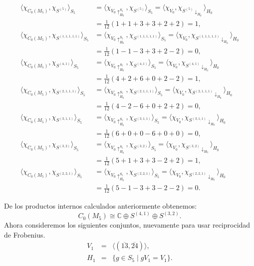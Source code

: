 \documentclass[12pt]{book}
\theoremstyle{definition}
\newcounter{in}
\begin{document}
  \begin{align*}
    \langle\chi_{C_{0}(M_{5})},\chi_{S^{(5)}}\rangle_{S_{5}}&=\langle\chi_{V_{0}\uparrow^{S_{5}}_{H_0}},\chi_{S^{(5)}}\rangle_{S_{5}}=\langle\chi_{V_{0}},\chi_{S^{(5)}\downarrow_{H_{0}}}\rangle_{H_{0}}\\ 
    &=\frac{1}{12}(1+1+3+3+2+2)=1,\\ 
    \langle\chi_{C_{0}(M_{5})},\chi_{S^{(1,1,1,1,1)}}\rangle_{S_{5}}&=\langle\chi_{V_{0}\uparrow^{S_{5}}_{H_0}},\chi_{S^{(1,1,1,1,1)}}\rangle_{S_{5}}=\langle\chi_{V_{0}},\chi_{S^{(1,1,1,1,1)}\downarrow_{H_{0}}}\rangle_{H_{0}}\\
    &=\frac{1}{12}(1-1-3+3+2-2)=0, \\
    \langle\chi_{C_{0}(M_{5})},\chi_{S^{(4,1)}}\rangle_{S_{5}}&=\langle\chi_{V_{0}\uparrow^{S_{5}}_{H_0}},\chi_{S^{(4,1)}}\rangle_{S_{5}}=\langle\chi_{V_{0}},\chi_{S^{(4,1)}\downarrow_{H_{0}}}\rangle_{H_{0}}\\
    &=\frac{1}{12}(4+2+6+0+2-2)=1, \\
    \langle\chi_{C_{0}(M_{5})},\chi_{S^{(2,1,1,1)}}\rangle_{S_{5}}&=\langle\chi_{V_{0}\uparrow^{S_{5}}_{H_0}},\chi_{S^{(2,1,1,1)}}\rangle_{S_{5}}=\langle\chi_{V_{0}},\chi_{S^{(2,1,1,1)}\downarrow_{H_{0}}}\rangle_{H_{0}}\\
    &=\frac{1}{12}(4-2-6+0+2+2)=0, \\
    \langle\chi_{C_{0}(M_{5})},\chi_{S^{(3,1,1)}}\rangle_{S_{5}}&=\langle\chi_{V_{0}\uparrow^{S_{5}}_{H_0}},\chi_{S^{(3,1,1)}}\rangle_{S_{5}}=\langle\chi_{V_{0}},\chi_{S^{(3,1,1)}\downarrow_{H_{0}}}\rangle_{H_{0}}\\
    &=\frac{1}{12}(6+0+0-6+0+0)=0, \\
    \langle\chi_{C_{0}(M_{5})},\chi_{S^{(3,2)}}\rangle_{S_{5}}&=\langle\chi_{V_{0}\uparrow^{S_{5}}_{H_0}},\chi_{S^{(3,2)}}\rangle_{S_{5}}=\langle\chi_{V_{0}},\chi_{S^{(3,2)}\downarrow_{H_{0}}}\rangle_{H_{0}}\\
    &=\frac{1}{12}(5+1+3+3-2+2)=1, \\
    \langle\chi_{C_{0}(M_{5})},\chi_{S^{(2,2,1)}}\rangle_{S_{5}}&=\langle\chi_{V_{0}\uparrow^{S_{5}}_{H_0}},\chi_{S^{(2,2,1)}}\rangle_{S_{5}}=\langle\chi_{V_{0}},\chi_{S^{(2,2,1)}\downarrow_{H_{0}}}\rangle_{H_{0}}\\
    &=\frac{1}{12}(5-1-3+3-2-2)=0. 
  \end{align*}

De los productos internos calculados anteriormente obtenemos:
\begin{equation}
  \label{eq:C0-M5}
  C_{0}(M_{5})\cong \mathbb{C}\oplus S^{(4,1)} \oplus S^{(3,2)}. 
\end{equation}
Ahora consideremos los siguientes conjuntos, nuevamente para usar
reciprocidad de Frobenius.
\begin{eqnarray*}
  V_{1}&=&\langle(\overline{13},\overline{24})\rangle,\\
  H_{1}&=&\{g\in S_{5}\mid gV_{1}=V_{1}\}.
\end{eqnarray*}
\end{document}
